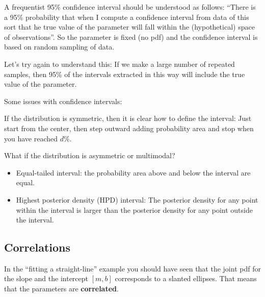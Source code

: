 \documentclass[%
oneside,                 %
final,                   %
10pt]{article}
\newenvironment{block_mdfboxadmon}[1][]{
\begin{block_mdfboxmdframed}[frametitle=#1]
}
{
\end{block_mdfboxmdframed}
}
\begin{document}

\begin{block_mdfboxadmon}[]
A frequentist 95\% confidence interval should be understood as follows: 
``There is a 95\% probability that when I compute a confidence interval from data of this sort that he true value of the parameter will fall within the (hypothetical) space of observations''. So the parameter is fixed (no pdf) and the confidence interval is based on random sampling of data. 

Let's try again to understand this: If we make a large number of repeated samples, then 95\% of the intervals extracted in this way will include the true value of the parameter.
\end{block_mdfboxadmon} %



Some issues with confidence intervals:

\begin{block_mdfboxadmon}[]
If the distribution is symmetric, then it is clear how to define the interval: Just start from the center, then step outward adding probability area and stop when you have reached $d \%$.
\end{block_mdfboxadmon} %




\begin{block_mdfboxadmon}[]
What if the distribution is asymmetric or multimodal? 
\begin{itemize}
\item Equal-tailed interval: the probability area above and below the interval are equal.

\item Highest posterior density (HPD) interval: The posterior density for any point within the interval is larger than the posterior density for any point outside the interval.
\end{itemize}

\noindent
\end{block_mdfboxadmon} %



\subsection{Correlations}
In the ``fitting a straight-line'' example you should have seen that the joint pdf for the slope and the intercept $[m, b]$ corresponds to a slanted ellipses. That means that the parameters are \textbf{correlated}.
\end{document}
